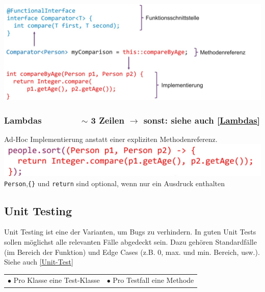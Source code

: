 {    \includegraphics[width=\linewidth]{pictures/methoden-referenzen.jpg}
    \vspace{-0.2cm} 


    \subsubsection{Lambdas $\qquad \qquad$ $\sim$ 3 Zeilen $\rightarrow$ sonst: siehe auch \ref{Lambdas}}
        Ad-Hoc Implementierung anstatt einer expliziten Methodenreferenz. \\
        \includegraphics[width=\linewidth-2cm]{pictures/lambda.jpg} \\
        \verb|Person|,\verb|{}| und \verb|return| sind optional, wenn nur ein Ausdruck enthalten
        \vspace{-0.1cm} 

\subsection{Unit Testing}
    Unit Testing ist eine der Varianten, um Bugs zu verhindern. In guten Unit Tests sollen möglichst alle relevanten Fälle abgedeckt sein.
    Dazu gehören Standardfälle (im Bereich der Funktion) und Edge Cases (z.B. 0, max. und min. Bereich, usw.). Siehe auch \ref{Unit-Test}\\
    \vspace{-0.3cm}

    \begin{tabular}{l l}
        $\bullet$ Pro Klasse eine Test-Klasse & $\bullet$ Pro Testfall eine Methode\\
    \end{tabular}
    \vspace{-0.3cm}

}
